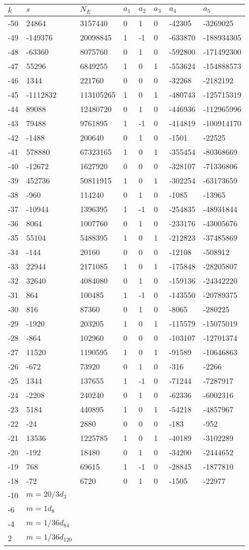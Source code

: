 \documentclass{amsart}
\begin{document}
\begin{longtable}{|l|l|l|lllll|}
\hline
$k$ & $s$ & $N_E$ & $a_1$ & $a_2$ & $a_3$ & $a_4$ & $a_5$\\
\hline
-50&24864&3157440&0&1&0&-42305&-3269025\\
-49&-149376&20098845&1&-1&0&-633870&-188934305\\
-48&-63360&8075760&0&1&0&-592800&-171492300\\
-47&55296&6849255&1&0&1&-553624&-154888573\\
-46&1344&221760&0&0&0&-32268&-2182192\\
-45&-1112832&113105265&1&0&1&-480743&-125715319\\
-44&89088&12480720&0&1&0&-446936&-112965996\\
-43&79488&9761895&1&-1&0&-414819&-100914170\\
-42&-1488&200640&0&1&0&-1501&-22525\\
-41&578880&67323165&1&0&1&-355454&-80368669\\
-40&-12672&1627920&0&0&0&-328107&-71336806\\
-39&452736&50811915&1&0&1&-302254&-63173659\\
-38&-960&114240&0&1&0&-1085&-13965\\
-37&-10944&1396395&1&-1&0&-254835&-48931844\\
-36&8064&1007760&0&1&0&-233176&-43005676\\
-35&55104&5488395&1&0&1&-212823&-37485869\\
-34&-144&20160&0&0&0&-12108&-508912\\
-33&22944&2171085&1&0&1&-175848&-28205807\\
-32&32640&4084080&0&1&0&-159136&-24342220\\
-31&864&100485&1&-1&0&-143550&-20789375\\
-30&816&87360&0&1&0&-8065&-280225\\
-29&-1920&203205&1&0&1&-115579&-15075019\\
-28&-864&102960&0&0&0&-103107&-12701374\\
-27&11520&1190595&1&0&1&-91589&-10646863\\
-26&-672&73920&0&1&0&-316&-2266\\
-25&1344&137655&1&-1&0&-71244&-7287917\\
-24&-2208&240240&0&1&0&-62336&-6002316\\
-23&5184&440895&1&0&1&-54218&-4857967\\
-22&-24&2880&0&0&0&-183&-952\\
-21&13536&1225785&1&0&1&-40189&-3102289\\
-20&-192&18480&0&1&0&-34200&-2444652\\
-19&768&69615&1&-1&0&-28845&-1877810\\
-18&-72&6720&0&1&0&-1505&-22977\\
-10&$m=20/3d_{3}$&&\multicolumn{5}{c|}{}\\
-6&$m=1d_{8}$&&\multicolumn{5}{c|}{}\\
-4&$m=1/36d_{84}$&&\multicolumn{5}{c|}{}\\
2&$m=1/36d_{120}$&&\multicolumn{5}{c|}{}\\
\hline
\end{longtable}
\end{document}
